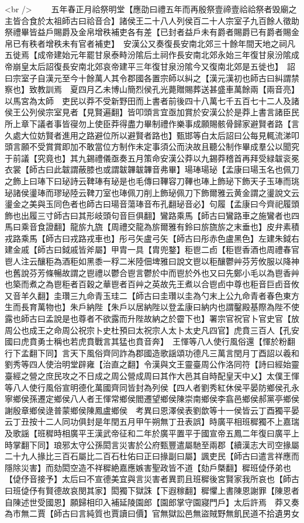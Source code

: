 <br />
　　五年春正月祫祭明堂【應劭曰禮五年而再殷祭壹禘壹祫祫祭者毁廟之主皆合食於太祖師古曰祫音合】諸侯王二十八人列侯百二十人宗室子九百餘人徵助祭禮畢皆益戶賜爵及金帛增秩補吏各有差【已封者益戶未有爵者賜爵已有爵者賜金帛已有秩者增秩未有官者補吏】　安漢公又奏復長安南北郊三十餘年間天地之祠凡五徙焉【成帝建始元年罷甘泉泰畤汾隂后土祠作長安南北郊永始三年復甘泉汾隂成帝崩皇太后詔復長安南北郊哀帝建平三年復甘泉汾隂今又復南北郊是五徙也】　詔曰宗室子自漢元至今十餘萬人其令郡國各置宗師以糾之【漢元漢初也師古曰糾謂禁察也】致教訓焉　夏四月乙未博山簡烈侯孔光薨贈賜葬送甚盛車萬餘兩【兩音亮】以馬宮為太師　吏民以莽不受新野田而上書者前後四十八萬七千五百七十二人及諸侯王公列侯宗室見者【見賢遍翻】皆叩頭言宜亟加賞於安漢公於是莽上書言諸臣民所上章下議者事皆寑勿上使臣莽得盡力畢制禮作樂事成願賜骸骨歸家避賢者路【言久處大位妨賢者進用之路避位所以避賢者路也】甄邯等白太后詔曰公每見輒流涕叩頭言願不受賞賞即加不敢當位方制作未定事須公而決故且聽公制作畢成羣公以聞究于前議【究竟也】其九錫禮儀亟奏五月策命安漢公莽以九錫莽稽首再拜受緑韍衮冕衣裳【師古曰此韍謂蔽膝也或謂韍韠韍韠音弗畢】瑒琫瑒珌【孟康曰瑒玉名也佩刀之飾上曰琫下曰珌詩云鞞琫有珌是也毛傳曰鞸容刀鞸也琫上飾珌下飾天子玉琫而珧珌諸侯璗琫而璆珌陸云鞞刀室也琫佩刀削上飾珌佩刀下飾爾雅云黄金謂之璗說文云璗金之美與玉同色者也師古曰瑒音蕩琫音布孔翻珌音必】句履【孟康曰今齊祀履頭飾也出履三寸師古曰其形岐頭句音巨俱翻】鸞路乘馬【師古曰鸞路車之施鸞者也四馬曰乘音食證翻】龍旂九旒【周禮交龍為旂爾雅有鈴曰旂旒旂之末垂也】皮弁素積戎路乘馬【師古曰戎路戎車也】彤弓矢盧弓矢【師古曰彤赤色盧黑色】左建朱鉞右建金戚【師古曰鉞戚皆斧屬】甲胄一具【胄兜鍪】秬鬯二卣【秬鬯香酒也周禮春官鬯人注云釀秬為酒秬如黑黍一稃二米陸佃埤雅曰說文鬯以秬釀鬱艸芬芳攸服以降神也舊說芬芳條暢故謂之鬯禮以鬱合鬯言鬱於中而鬯於外也又曰先鄭小毛以為鬯香艸也築而煮之為鬯秬者百穀之華鬯者百艸之英故先王煮以合鬯卣中尊也秬音巨卣音攸又音羊久翻】圭瓚三九命青玉珪二【師古曰圭瓚以圭為勺末上公九命青者春色東方生而長育萬物也】朱戶納陛【朱戶以居納陛以登孟康曰納内也謂鑿殿基際為陛不使露也師古曰孟說是也尊者不欲露而升陛故納之於霤下也】署宗官祝官卜官史官【放周公也成王之命周公祝宗卜史杜預曰太祝宗人太卜太史凡四官】虎賁三百人【孔安國曰虎賁勇士稱也若虎賁戰言其猛也賁音奔】　王惲等八人使行風俗還【惲於粉翻行下孟翻下同】言天下風俗齊同詐為郡國造歌謡頌功德凡三萬言閏月丁酉詔以羲和劉秀等四人使治明堂辟雍【治直之翻】令漢與文王靈臺周公作洛同符【詩曰經始靈臺經之營之庶民攻之不日成之周公營成周曰其作大邑其自時配皇天中乂】太僕王惲等八人使行風俗宣明德化萬國齊同皆封為列侯【四人者劉秀紅休侯平晏防鄉侯孔永寧鄉侯孫遷定鄉侯八人者王惲常鄉侯閻遷望鄉侯陳崇南鄉侯李翕邑鄉侯郝黨亭鄉侯謝殷章鄉侯逯普蒙鄉侯陳鳳盧鄉侯　考異曰恩澤侯表劉歆等十一侯皆云丁酉獨平晏云丁丑按十二人同功俱封是年閏五月甲午朔無丁丑表誤】時廣平相班穉獨不上嘉瑞及歌謡【班穉時相廣平王漢武帝征和二年於廣平置平于國宣帝五鳳二年復曰廣平上時掌翻下同】琅邪太守公孫閎言災害於公府甄豐遣屬馳至兩郡【續漢志大司空掾屬二十九人掾比三百石屬比二百石杜佑曰正曰掾副曰屬】諷吏民【師古曰遣言祥應而隱除災害】而劾閎空造不祥穉絶嘉應嫉害聖政皆不道【劾戶槩翻】穉班偼伃弟也【偼伃音接予】太后曰不宣德美宜與言災害者異罰且班穉後宮賢家我所哀也【師古曰班偼伃有賢德故哀閔其家】閎獨下獄誅【下遐稼翻】穉懼上書陳恩謝罪【陳恩者自陳述世受國恩】願歸相印入補延陵園郎【園郎掌守園寢門戶】太后許焉　莽又奏為市無二賈【師古曰言純質也賈讀曰價】官無獄訟邑無盜賊野無飢民道不拾遺男女